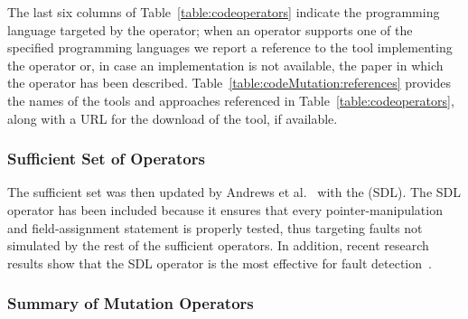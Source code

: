 The last six columns of Table~\ref{table:codeoperators} indicate the programming language targeted by the operator; when an operator supports one of the specified programming languages we report a reference to the tool implementing the operator or, in case an implementation is not available, the paper in which the operator has been described. 
Table~\ref{table:codeMutation:references} provides the names of the tools and approaches referenced in Table~\ref{table:codeoperators}, along with a URL for the download of the tool, if available.





\clearpage

\subsubsection{Sufficient Set of Operators}
\label{sec:sub:sufficient}

The sufficient set was then updated by Andrews et al.~\cite{andrews2005mutation} with the  (SDL). The SDL operator has been included because it ensures that every pointer-manipulation and field-assignment statement is properly tested, thus targeting faults not simulated by the rest of the sufficient operators. In addition, recent research results show that the SDL operator is the most effective for fault detection~\cite{delamaro2014designing}. 

\subsubsection{Summary of Mutation Operators}
\label{sec:sub:summaryoperators}

